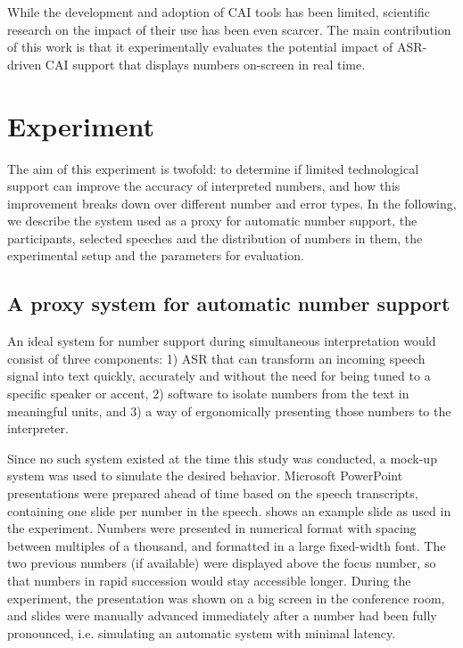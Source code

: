 \documentclass[output=paper]{langsci/langscibook}
\begin{document}
While the development and adoption of \textsc{CAI} tools has been limited, scientific research on the impact of their use has been even scarcer. The main contribution of this work is that it experimentally evaluates the potential impact of \textsc{ASR}-driven CAI support that displays numbers on-screen in real time.

\section{Experiment}

The aim of this experiment is twofold: to determine if limited technological support can improve the accuracy of interpreted numbers, and how this improvement breaks down over different number and error types. In the following, we describe the system used as a proxy for automatic number support, the participants, selected speeches and the distribution of numbers in them, the experimental setup and the parameters for evaluation.

\subsection{A proxy system for automatic number support}

An ideal system for number support during simultaneous interpretation would consist of three components: 1) \textsc{ASR} that can transform an incoming speech signal into text quickly, accurately and without the need for being tuned to a specific speaker or accent, 2) software to isolate numbers from the text in meaningful units, and 3) a way of ergonomically presenting those numbers to the interpreter.

Since no such system existed at the time this study was conducted, a mock-up system was used to simulate the desired behavior. Microsoft PowerPoint presentations were prepared ahead of time based on the speech transcripts, containing one slide per number in the speech.  shows an example slide as used in the experiment. Numbers were presented in numerical format with spacing between multiples of a thousand, and formatted in a large fixed-width font. The two previous numbers (if available) were displayed above the focus number, so that numbers in rapid succession would stay accessible longer. During the experiment, the presentation was shown on a big screen in the conference room, and slides were manually advanced immediately after a number had been fully pronounced, i.e. simulating an automatic system with minimal latency.
\end{document}
